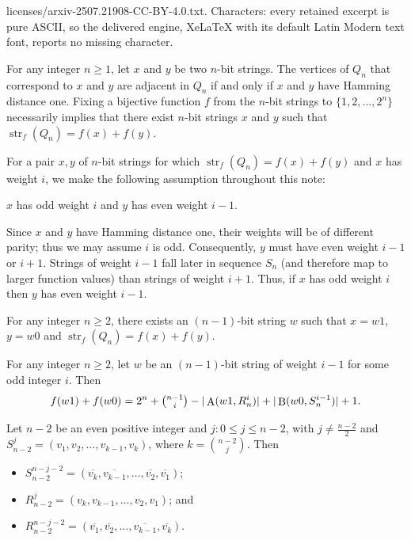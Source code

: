 \documentclass[10pt,a4paper]{amsart}
\DeclareMathOperator{\Prec}{B}
\DeclareMathOperator{\Succ}{A}
\DeclareMathOperator{\str}{str}
\begin{document}
licenses/arxiv-2507.21908-CC-BY-4.0.txt. Characters: every retained excerpt is pure ASCII, so the delivered engine, XeLaTeX with its default Latin Modern text font, reports no missing character.
\begin{remark}\label{remark1}
For any integer $n \geq 1$, let $x$ and $y$ be two $n$-bit strings. The vertices of $Q_n$ that correspond to $x$ and $y$ are adjacent in $Q_n$ if and only if $x$ and $y$ have Hamming distance one. Fixing a bijective function $f$ from the $n$-bit strings to $\{1, 2, \ldots, 2^n\}$ necessarily implies that there exist $n$-bit strings $x$ and $y$ such that $\str_f(Q_n) = f(x)+f(y)$. 

For a pair $x,y$ of $n$-bit strings for which  $\str_f(Q_n)=f(x)+f(y)$ and $x$ has weight $i$, we make the following assumption throughout this note: 

\begin{center}
    $x$ has odd weight $i$ and $y$ has even weight $i-1$.
\end{center}

\noindent
Since $x$ and $y$ have Hamming distance one, their weights will be of different parity; thus we may assume $i$ is odd.  Consequently, $y$ must have even weight $i-1$ or $i+1$.  Strings of weight $i-1$ fall later in sequence $S_n$ (and therefore map to larger function values) than strings of weight $i+1$. Thus, if $x$ has odd weight $i$ then $y$ has even weight $i-1$.
 \end{remark}

\begin{lemma}\label{lem:ends} For any integer $n \geq 2$, there exists an $(n-1)$-bit string $w$ such that $x=w1$, $y=w0$ and $\str_f(Q_n) = f(x)+f(y)$.
\end{lemma}

\begin{lemma}\label{obs:x'y'} For any integer $n \geq 2$, let $w$ be an $(n-1)$-bit string of weight $i-1$ for some odd integer $i$.  Then $$f(w1)+f(w0) = 2^n + \tbinom{n-1}{i} - |\Succ(w1,R_n^i)|+|\Prec(w0,S_n^{i-1})|+1.$$\end{lemma}

\begin{lemma}\label{lemma0.1} Let $n-2$ be an even positive integer and $j: 0\leq j \leq n-2$, with $j \neq \frac{n-2}{2}$ and $S_{n-2}^j = (v_1,v_2,\dots,v_{k-1},v_k)$, where $k = \binom{n-2}{j}$. Then \begin{itemize}
\item $S_{n-2}^{n-j-2} = (\overline{v_k},\overline{v_{k-1}},\dots,\overline{v_2},\overline{v_1})$;
\item $R_{n-2}^j = (v_k,v_{k-1},\dots,v_2,v_1)$; and 
\item $R_{n-2}^{n-j-2}=(\overline{v_1},\overline{v_2},\dots,\overline{v_{k-1}},\overline{v_k}).$\end{itemize}\end{lemma}
\end{document}
